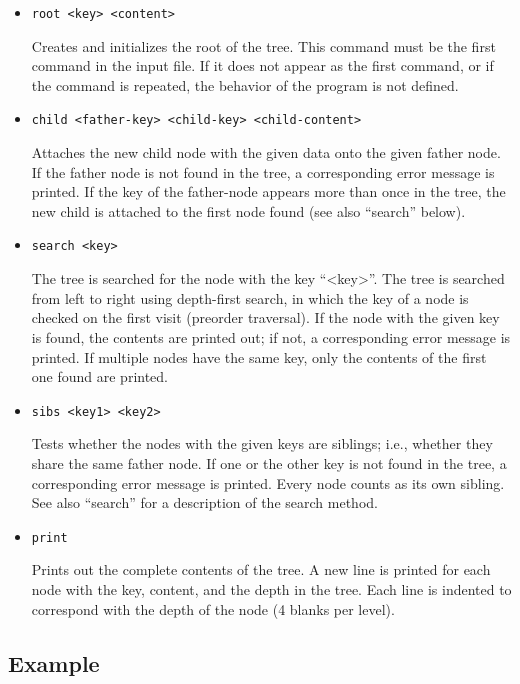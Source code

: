 \begin{itemize}

\item {\tt root <key> <content>}

Creates and initializes the root of the tree.
This command must be the first command in the input file.
If it does not appear as the first command, or if the command is
repeated, the behavior of the program is not defined.

\item {\tt child <father-key> <child-key> <child-content>}

Attaches the new child node with the given data onto the given father
node. 
If the father node is not found in the tree, a corresponding error
message is printed. 
If the key of the father-node appears more than once in the tree, the
new child is attached to the first node found (see also ``search''
below).

\item {\tt search <key>}

The tree is searched for the node with the key ``<key>''.
The tree is searched from left to right using depth-first search,
in which the key of a node is checked on the first visit (preorder
traversal). 
If the node with the given key is found, the contents are printed out;
if not, a corresponding error message is printed.
If multiple nodes have the same key, only the contents of the first
one found are printed. 

\item {\tt sibs <key1> <key2>}

Tests whether the nodes with the given keys are siblings; i.e.,
whether they share the same father node.
If one or the other key is not found in the tree, a corresponding
error message is printed.
Every node counts as its own sibling.  
See also ``search'' for a description of the search method.

\item {\tt print}

Prints out the complete contents of the tree.  A new line is printed
for each node with the key, content, and the depth in the tree.
Each line is indented to correspond with the depth of the
node (4 blanks per level).

\end{itemize}

\subsection*{Example}

